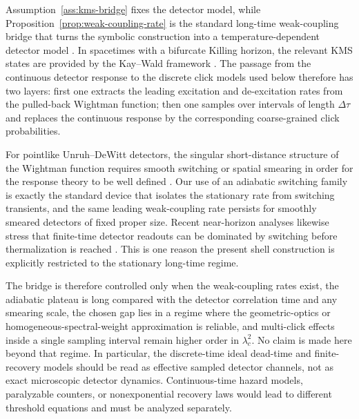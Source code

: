 \begin{remark}\label{rem:kms-bridge-limitations}
Assumption~\ref{ass:kms-bridge} fixes the detector model, while Proposition~\ref{prop:weak-coupling-rate} is the standard long-time weak-coupling bridge that turns the symbolic construction into a temperature-dependent detector model \cite{BirDav1982,BreuerPetruccione2002}. In spacetimes with a bifurcate Killing horizon, the relevant KMS states are provided by the Kay--Wald framework \cite{KayWald1991}. The passage from the continuous detector response to the discrete click models used below therefore has two layers: first one extracts the leading excitation and de-excitation rates from the pulled-back Wightman function; then one samples over intervals of length $\Delta\tau$ and replaces the continuous response by the corresponding coarse-grained click probabilities.

For pointlike Unruh--DeWitt detectors, the singular short-distance structure of the Wightman function requires smooth switching or spatial smearing in order for the response theory to be well defined \cite{LoukoSatz2006,LoukoSatz2008}. Our use of an adiabatic switching family is exactly the standard device that isolates the stationary rate from switching transients, and the same leading weak-coupling rate persists for smoothly smeared detectors of fixed proper size. Recent near-horizon analyses likewise stress that finite-time detector readouts can be dominated by switching before thermalization is reached \cite{ShallueCarroll2025}. This is one reason the present shell construction is explicitly restricted to the stationary long-time regime.

The bridge is therefore controlled only when the weak-coupling rates exist, the adiabatic plateau is long compared with the detector correlation time and any smearing scale, the chosen gap lies in a regime where the geometric-optics or homogeneous-spectral-weight approximation is reliable, and multi-click effects inside a single sampling interval remain higher order in $\lambda_c^2$. No claim is made here beyond that regime. In particular, the discrete-time ideal dead-time and finite-recovery models should be read as effective sampled detector channels, not as exact microscopic detector dynamics. Continuous-time hazard models, paralyzable counters, or nonexponential recovery laws would lead to different threshold equations and must be analyzed separately.
\end{remark}

